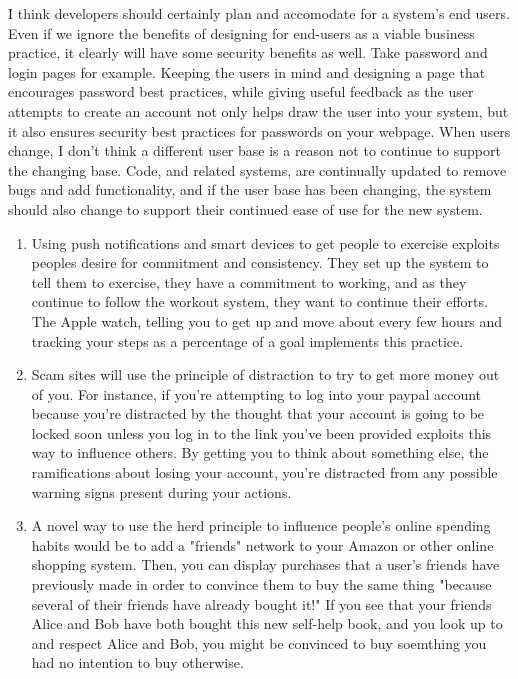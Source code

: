 I think developers should certainly plan and accomodate for a system's end users. Even if we ignore the benefits of designing for end-users as a viable business practice, it clearly will have some security benefits as well. Take password and login pages for example. Keeping the users in mind and designing a page that encourages password best practices, while giving useful feedback as the user attempts to create an account not only helps draw the user into your system, but it also ensures security best practices for passwords on your webpage. When users change, I don't think a different user base is a reason not to continue to support the changing base. Code, and related systems, are continually updated to remove bugs and add functionality, and if the user base has been changing, the system should also change to support their continued ease of use for the new system. \\


\begin{enumerate}
    \item Using push notifications and smart devices to get people to exercise exploits peoples desire for commitment and consistency. They set up the system to tell them to exercise, they have a commitment to working, and as they continue to follow the workout system, they want to continue their efforts. The Apple watch, telling you to get up and move about every few hours and tracking your steps as a percentage of a goal implements this practice.
    \item Scam sites will use the principle of distraction to try to get more money out of you. For instance, if you're attempting to log into your paypal account because you're distracted by the thought that your account is going to be locked soon unless you log in to the link you've been provided exploits this way to influence others. By getting you to think about something else, the ramifications about losing your account, you're distracted from any possible warning signs present during your actions.
    \item A novel way to use the herd principle to influence people's online spending habits would be to add a "friends" network to your Amazon or other online shopping system. Then, you can display purchases that a user's friends have previously made in order to convince them to buy the same thing "because several of their friends have already bought it!" If you see that your friends Alice and Bob have both bought this new self-help book, and you look up to and respect Alice and Bob, you might be convinced to buy soemthing you had no intention to buy otherwise.
\end{enumerate}

